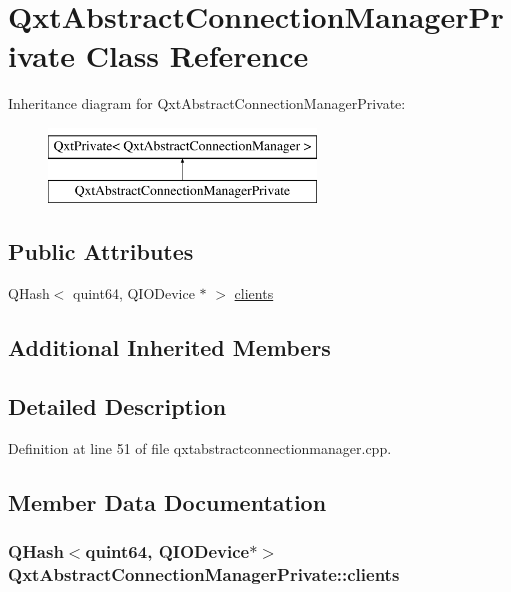 \hypertarget{class_qxt_abstract_connection_manager_private}{\section{Qxt\-Abstract\-Connection\-Manager\-Private Class Reference}
\label{class_qxt_abstract_connection_manager_private}
}
Inheritance diagram for Qxt\-Abstract\-Connection\-Manager\-Private\-:\begin{figure}[H]
\begin{center}
\leavevmode
\includegraphics[height=2.000000cm]{class_qxt_abstract_connection_manager_private}
\end{center}
\end{figure}
\subsection*{Public Attributes}
\begin{DoxyCompactItemize}
\item 
Q\-Hash$<$ quint64, Q\-I\-O\-Device $\ast$ $>$ \hyperlink{class_qxt_abstract_connection_manager_private_a87e347e28749f06760f0d988c77945a5}{clients}
\end{DoxyCompactItemize}
\subsection*{Additional Inherited Members}


\subsection{Detailed Description}


Definition at line 51 of file qxtabstractconnectionmanager.\-cpp.



\subsection{Member Data Documentation}
\hypertarget{class_qxt_abstract_connection_manager_private_a87e347e28749f06760f0d988c77945a5}{
\subsubsection[{clients}]{\setlength{\rightskip}{0pt plus 5cm}Q\-Hash$<$quint64, Q\-I\-O\-Device$\ast$$>$ Qxt\-Abstract\-Connection\-Manager\-Private\-::clients}}\label{class_qxt_abstract_connection_manager_private_a87e347e28749f06760f0d988c77945a5}


